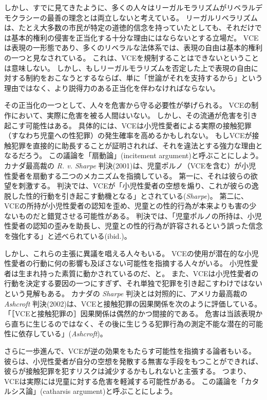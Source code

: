 \documentclass[paper=a4,book,openany]{jlreq} \usepackage{mystyle}
\begin{document}
しかし、すでに見てきたように、多くの人々はリーガルモラリズムがリベラルデモクラシーの最善の理念とは両立しないと考えている。
リーガルリベラリズムは、たとえ大多数の市民が特定の道徳的信念を持っていたとしても、それだけでは基本的権利の侵害を正当化する十分な理由にはならないとする立場だ。
VCEは表現の一形態であり、多くのリベラルな法体系では、表現の自由は基本的権利の一つと見なされている。
これは、VCEを規制することはできないということは意味しない。
しかし、もしリーガルモラリズムを否定した上で表現の自由に対する制約をおこなうとするならば、単に「世論がそれを支持するから」という理由ではなく、より説得力のある正当化を伴わなければならない。

その正当化の一つとして、人々を危害から守る必要性が挙げられる。
VCEの制作において、実際に危害を被る人間はいない。
しかし、その流通が危害を引き起こす可能性はある。
具体的には、VCEは小児性愛者による実際の接触犯罪（すなわち児童への性犯罪）の発生確率を高めるかもしれない。
もしVCEが接触犯罪を直接的に助長することが証明されれば、それを違法とする強力な理由となるだろう。
この議論を「扇動論」(incitement argument)と呼ぶことにしよう。
カナダ最高裁の \emph{R. v. Sharpe} 判決(2001)は、児童ポルノ（VCEを含む）が小児性愛者を扇動する二つのメカニズムを指摘している。
第一に、それは彼らの欲望を刺激する。
判決では、VCEが「小児性愛者の空想を煽り、これが彼らの逸脱した性的行動を引き起こす動機となる」とされている(\emph{Sharpe})。
第二に、VCEの所持が小児性愛者の認知を歪め、児童との性的行為が本来よりも害の少ないものだと錯覚させる可能性がある。
判決では、「児童ポルノの所持は、小児性愛者の認知の歪みを助長し、児童との性的行為が許容されるという誤った信念を強化する」と述べられている(ibid.)。

しかし、これらの主張に異議を唱える人々もいる。
VCEの使用が潜在的な小児性愛者の行動に何の影響も及ぼさない可能性を指摘する人々がいる。
小児性愛者は生まれ持った素質に動かされているのだ、と。
また、VCEは小児性愛者の行動を決定する要因の一つにすぎず、それ単独で犯罪を引き起こすわけではないという見解もある。
カナダの \emph{Sharpe} 判決とは対照的に、アメリカ最高裁の \emph{Ashcroft} 判決(2002)は、VCEと接触犯罪の因果関係を次のように評価している。
「［VCEと接触犯罪の］因果関係は偶然的かつ間接的である。
危害は当該表現から直ちに生じるのではなく、その後に生じうる犯罪行為の測定不能な潜在的可能性に依存している」(\emph{Ashcroft})。

さらに一歩進んで、VCEが逆の効果をもたらす可能性を指摘する論者もいる。
彼らは、小児性愛者が自分の空想を発散する無害な手段をもつことができれば、彼らが接触犯罪を犯すリスクは減少するかもしれないと主張する。
つまり、VCEは実際には児童に対する危害を軽減する可能性がある。
この議論を「カタルシス論」(catharsis argument)と呼ぶことにしよう。
\end{document}
